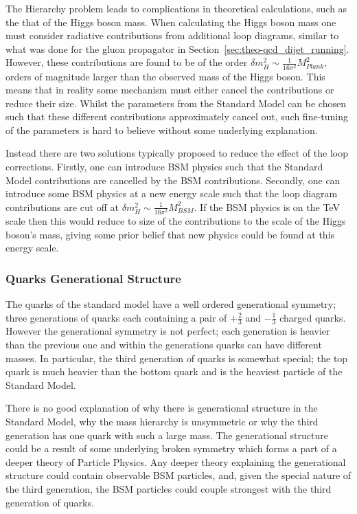 The Hierarchy problem leads to complications in theoretical calculations, such as the that of the Higgs boson mass.
When calculating the Higgs boson mass one must consider
radiative contributions from additional loop diagrams,
similar to what was done for the gluon propagator in Section~\ref{sec:theo-qcd_dijet_running}.
However, these contributions are found to be of the order $\delta m_H^2 \sim \frac{1}{16\pi^2} M_{Plank}^2$\hspace{0.2mm},
orders of magnitude larger than the observed mass of the Higgs boson.
This means that in reality some mechanism must either cancel the contributions or reduce their size.
Whilst the parameters from the Standard Model can be chosen such that these different contributions approximately cancel out,
such fine-tuning of the parameters is hard to believe without some underlying explanation.

Instead there are two solutions typically proposed to reduce the effect of the loop corrections.
Firstly, one can introduce BSM physics such that the Standard Model contributions are cancelled by the BSM contributions.
Secondly, one can introduce some BSM physics at a new energy scale
such that the loop diagram contributions are cut off at $\delta m_H^2 \sim \frac{1}{16\pi^2} M_{BSM}^2$.
If the BSM physics is on the TeV scale then this would reduce to size of the contributions to the scale of the Higgs boson's mass,
giving some prior belief that new physics could be found at this energy scale.

\subsubsection{Quarks Generational Structure}
\label{sec:theo-bsm_3g}

The quarks of the standard model have a well ordered generational symmetry;
three generations of quarks each containing a pair of $+\frac{2}{3}$ and $-\frac{1}{3}$ charged quarks.
However the generational symmetry is not perfect;
each generation is heavier than the previous one
and within the generations quarks can have different masses.
In particular, the third generation of quarks is somewhat special;
the top quark is much heavier than the bottom quark
and is the heaviest particle of the Standard Model.

There is no good explanation of why there is generational structure in the Standard Model,
why the mass hierarchy is unsymmetric 
or why the third generation has one quark with such a large mass.
The generational structure could be a result of some underlying broken symmetry
which forms a part of a deeper theory of Particle Physics.
Any deeper theory explaining the generational structure could contain observable BSM particles,
and, given the special nature of the third generation,
the BSM particles could couple strongest with the third generation of quarks.

